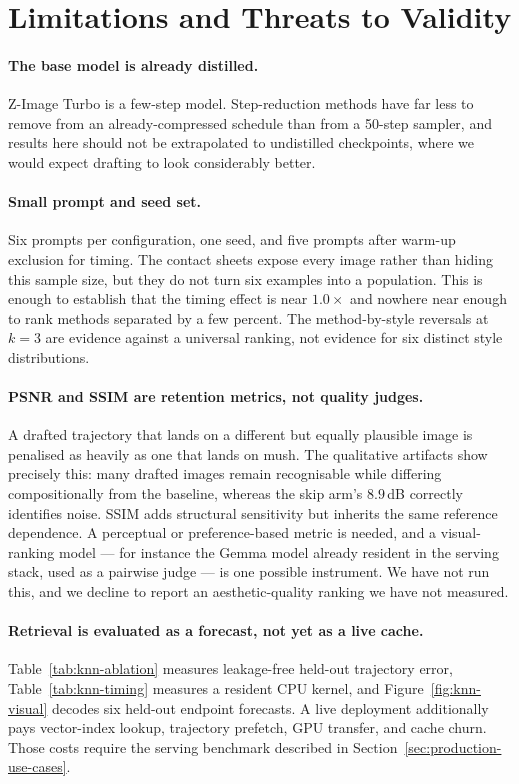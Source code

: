 \documentclass[11pt,a4paper]{article}
\begin{document}
\section{Limitations and Threats to Validity}
\label{sec:limitations}

\paragraph{The base model is already distilled.} Z-Image Turbo is a few-step
model. Step-reduction methods have far less to remove from an already-compressed
schedule than from a 50-step sampler, and results here should not be
extrapolated to undistilled checkpoints, where we would expect drafting to look
considerably better.

\paragraph{Small prompt and seed set.} Six prompts per configuration, one seed,
and five prompts after warm-up exclusion for timing. The contact sheets expose
every image rather than hiding this sample size, but they do not turn six
examples into a population. This is enough to establish that the timing effect
is near $1.0\times$ and nowhere near enough to rank methods separated by a few
percent. The method-by-style reversals at $k=3$ are evidence against a universal
ranking, not evidence for six distinct style distributions.

\paragraph{PSNR and SSIM are retention metrics, not quality judges.} A drafted
trajectory that lands on a different but equally plausible image is penalised as
heavily as one that lands on mush. The qualitative artifacts show precisely
this: many drafted images remain recognisable while differing compositionally
from the baseline, whereas the skip arm's $8.9$\,dB correctly identifies noise.
SSIM adds structural sensitivity but inherits the same reference dependence. A
perceptual or preference-based metric is needed, and a visual-ranking model ---
for instance the Gemma model already resident in the serving stack, used as a
pairwise judge --- is one possible instrument. We have not run this, and we
decline to report an aesthetic-quality ranking we have not measured.

\paragraph{Retrieval is evaluated as a forecast, not yet as a live cache.}
Table~\ref{tab:knn-ablation} measures leakage-free held-out trajectory error,
Table~\ref{tab:knn-timing} measures a resident CPU kernel, and
Figure~\ref{fig:knn-visual} decodes six held-out endpoint forecasts. A live
deployment additionally pays vector-index lookup, trajectory prefetch, GPU
transfer, and cache churn. Those costs require the serving benchmark described
in Section~\ref{sec:production-use-cases}.
\end{document}
